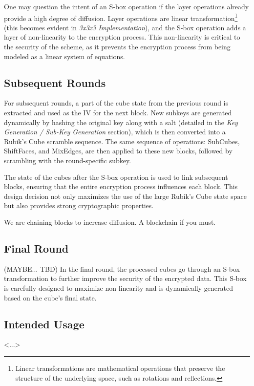 \documentclass[12pt]{article}
\begin{document}
One may question the intent of an S-box operation if the layer operations already provide a high degree of diffusion. Layer operations are linear transformation\footnote{Linear transformations are mathematical operations that preserve the structure of the underlying space, such as rotations and reflections.} (this becomes evident in \textit{3x3x3 Implementation}), and the S-box operation adds a layer of non-linearity to the encryption process. This non-linearity is critical to the security of the scheme, as it prevents the encryption process from being modeled as a linear system of equations. 

\vspace{0.5cm}

\subsection{Subsequent Rounds}
For subsequent rounds, a part of the cube state from the previous round is extracted and used as the IV for the next block. New subkeys are generated dynamically by hashing the original key along with a salt (detailed in the \textit{Key Generation / Sub-Key Generation} section), which is then converted into a Rubik's Cube scramble sequence. The same sequence of operations: SubCubes, ShiftFaces, and MixEdges, are then applied to these new blocks, followed by scrambling with the round-specific subkey.

The state of the cubes after the S-box operation is used to link subsequent blocks, ensuring that the entire encryption process influences each block. This design decision not only maximizes the use of the large Rubik's Cube state space but also provides strong cryptographic properties.

We are chaining blocks to increase diffusion. A blockchain if you must.
\subsection{Final Round}

(MAYBE... TBD) In the final round, the processed cubes go through an S-box transformation to further improve the security of the encrypted data. This S-box is carefully designed to maximize non-linearity and is dynamically generated based on the cube's final state.

\subsection{Intended Usage}
<...>
\end{document}
